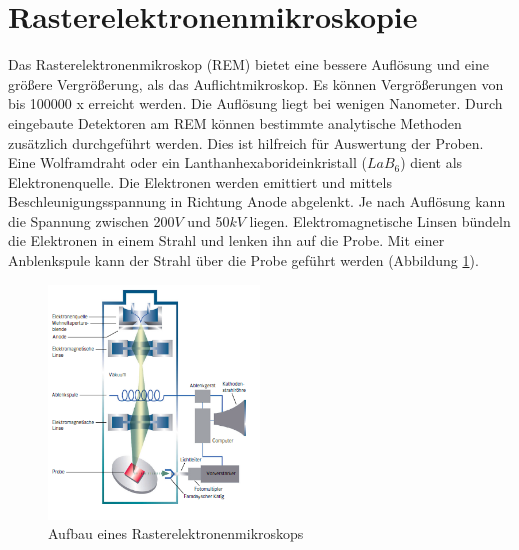 \documentclass[a4paper, 11pt]{tubsreprt}
\begin{document}
\section{Rasterelektronenmikroskopie}\label{Rasterelektronenmikroskopie}
Das Rasterelektronenmikroskop (REM) bietet eine bessere Auflösung und eine größere Vergrößerung, als das Auflichtmikroskop. Es können Vergrößerungen von bis 100000 x erreicht werden. Die Auflösung liegt bei wenigen Nanometer. Durch eingebaute Detektoren am REM können bestimmte analytische Methoden zusätzlich  durchgeführt werden. Dies ist hilfreich für Auswertung der Proben.
Eine Wolframdraht oder ein Lanthanhexaborideinkristall ($LaB_{6}$) dient als Elektronenquelle. Die Elektronen werden emittiert und mittels Beschleunigungsspannung in Richtung Anode abgelenkt. Je nach Auflösung kann die Spannung zwischen 200$V$ und 50$kV$ liegen. Elektromagnetische Linsen bündeln die Elektronen in einem Strahl und lenken ihn auf die Probe. Mit einer Anblenkspule kann der Strahl über die Probe geführt werden (Abbildung \ref{REM Bild}).

\begin{figure} %
\centering
\includegraphics[width=0.5\textwidth]{Bilder/REM.png}
\caption{Aufbau eines Rasterelektronenmikroskops}
\label{REM Bild}
\end{figure}
\end{document}

